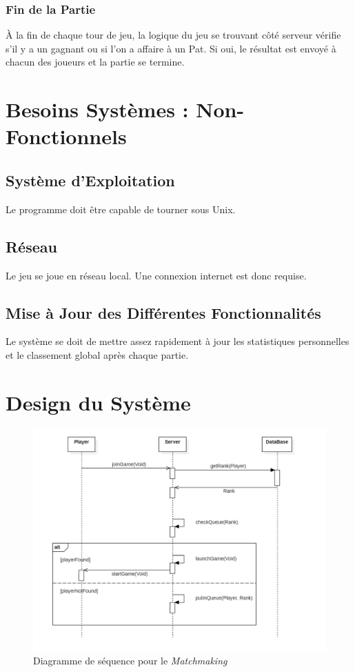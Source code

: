 \documentclass[10pt, a4paper]{article}
\begin{document}
\subsubsection{Fin de la Partie}
À la fin de chaque tour de jeu, la logique du jeu se trouvant côté serveur vérifie s'il y a un gagnant ou si l'on a affaire à un Pat. Si oui, le résultat est envoyé à chacun des joueurs et la partie se termine.


\section{Besoins Systèmes : Non-Fonctionnels}


\subsection{Système d'Exploitation}
Le programme doit être capable de tourner sous Unix. \\

\subsection{Réseau}
Le jeu se joue en réseau local. Une connexion internet est donc requise. \\

\subsection{Mise à Jour des Différentes Fonctionnalités}
Le système se doit de mettre assez rapidement à jour les statistiques personnelles et le classement global après chaque partie.

\section{Design du Système}

\begin{figure}[H]
\centering
\includegraphics[scale=0.72]{SequenceDiagramMatchmaking.png}
\caption{Diagramme de séquence pour le \textit{Matchmaking}}
\label{SD_matchmaker} %
\end{figure}
\end{document}
